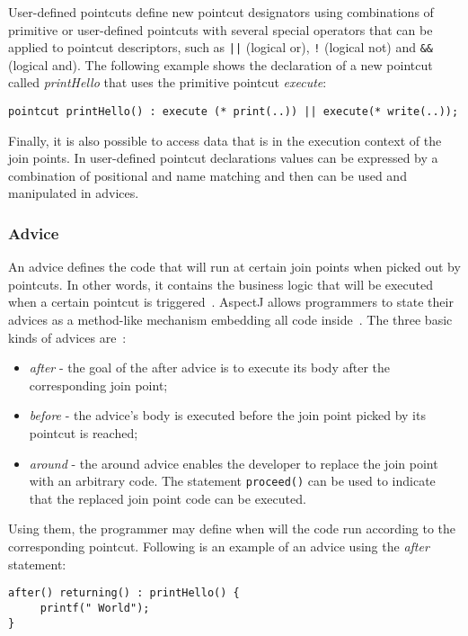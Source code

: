 \documentclass{template}
\begin{document}
User-defined pointcuts define new pointcut designators using combinations of primitive or user-defined pointcuts with several special operators that
can be applied to pointcut descriptors, such as \texttt{||} (logical or), \texttt{!} (logical not) and \texttt{\&\&} (logical and).
The following example shows the declaration of a new pointcut called \textit{printHello} that uses the primitive pointcut \textit{execute}: 

\verb!pointcut printHello() : execute (* print(..)) || execute(* write(..));!

Finally, it is also possible to access data that is in the execution context of the join points. In user-defined pointcut declarations values can
be expressed by a combination of positional and name matching and then can be used and manipulated in advices. 

\subsubsection{Advice}

An advice defines the code that will run at certain join points when picked out by pointcuts. In other words, it contains the business logic that will be executed when a certain pointcut is triggered~\cite{Kiselev2002}. AspectJ allows programmers to state their advices as a method-like mechanism embedding all code inside~\cite{Kiczales97aspect-orientedprogramming}. The three basic kinds of advices are~\cite{Kiselev2002}:

\begin{itemize}
\item \textit{after} - the goal of the after advice is to execute its body after the corresponding join point;
\item \textit{before} - the advice's body is executed before the join point picked by its pointcut is reached;
\item \textit{around} - the around advice enables the developer to replace the join point with an arbitrary code. The statement \texttt{proceed()} can be used to indicate that the replaced join point code can be executed.
\end{itemize}

Using them, the programmer may define when will the code run according to the corresponding pointcut. Following is an example of an advice using the \textit{after} statement:

\verb!after() returning() : printHello() {!\\
\verb!     printf(" World");!\\
\verb!}!
\end{document}
